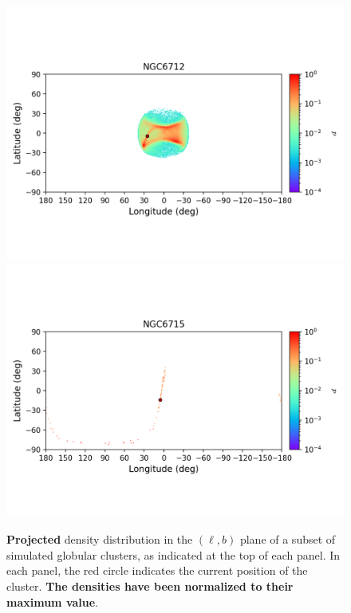 \begin{figure}
        \includegraphics[clip=true, trim = 0mm 20mm 0mm 10mm, width=1\columnwidth]{images/error_plots_NGC6712.png}
        \includegraphics[clip=true, trim = 0mm 20mm 0mm 10mm, width=1\columnwidth]{images/error_plots_NGC6715.png}
        \caption[]{\textbf{Projected} density distribution in the $(\ell, b)$ plane of a subset of simulated globular clusters, as indicated at the top of each panel. In each panel, the red circle indicates the current position of the cluster. \textbf{The densities have been normalized to their maximum value}.}\label{stream14}
        \end{figure}
